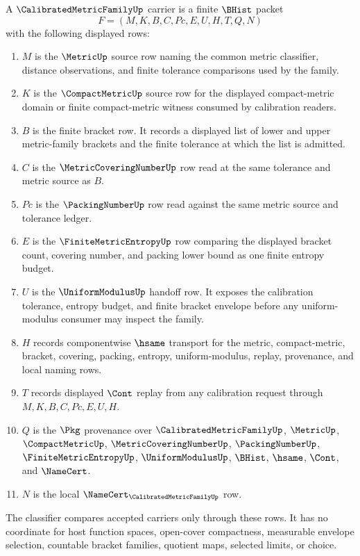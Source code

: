 \begin{definition}
\label{def:calibrated-metric-family-carrier}
A $\CalibratedMetricFamilyUp$ carrier is a finite $\BHist$ packet
$$
F=(M,K,B,C,Pc,E,U,H,T,Q,N)
$$
with the following displayed rows:
\begin{enumerate}
\item $M$ is the $\MetricUp$ source row naming the common metric classifier, distance observations, and finite tolerance comparisons used by the family.
\item $K$ is the $\CompactMetricUp$ source row for the displayed compact-metric domain or finite compact-metric witness consumed by calibration readers.
\item $B$ is the finite bracket row. It records a displayed list of lower and upper metric-family brackets and the finite tolerance at which the list is admitted.
\item $C$ is the $\MetricCoveringNumberUp$ row read at the same tolerance and metric source as $B$.
\item $Pc$ is the $\PackingNumberUp$ row read against the same metric source and tolerance ledger.
\item $E$ is the $\FiniteMetricEntropyUp$ row comparing the displayed bracket count, covering number, and packing lower bound as one finite entropy budget.
\item $U$ is the $\UniformModulusUp$ handoff row. It exposes the calibration tolerance, entropy budget, and finite bracket envelope before any uniform-modulus consumer may inspect the family.
\item $H$ records componentwise $\hsame$ transport for the metric, compact-metric, bracket, covering, packing, entropy, uniform-modulus, replay, provenance, and local naming rows.
\item $T$ records displayed $\Cont$ replay from any calibration request through $M,K,B,C,Pc,E,U,H$.
\item $Q$ is the $\Pkg$ provenance over $\CalibratedMetricFamilyUp$, $\MetricUp$, $\CompactMetricUp$, $\MetricCoveringNumberUp$, $\PackingNumberUp$, $\FiniteMetricEntropyUp$, $\UniformModulusUp$, $\BHist$, $\hsame$, $\Cont$, and $\NameCert$.
\item $N$ is the local $\NameCert_{\CalibratedMetricFamilyUp}$ row.
\end{enumerate}
The classifier compares accepted carriers only through these rows. It has no coordinate for host function spaces, open-cover compactness, measurable envelope selection, countable bracket families, quotient maps, selected limits, or choice.
\end{definition}

